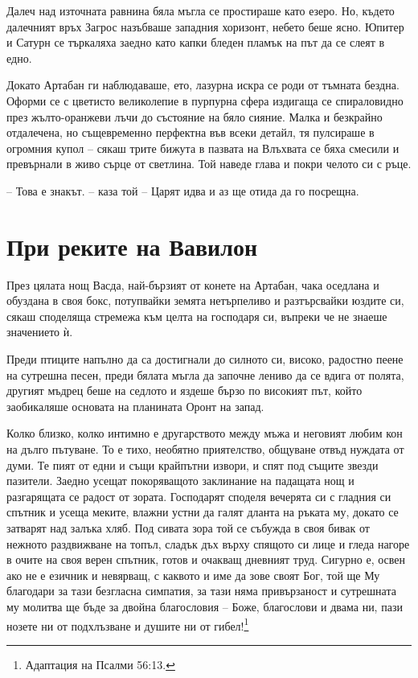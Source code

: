 Далеч над източната равнина бяла мъгла се простираше като езеро. Но, където
далечният връх Загрос назъбваше западния хоризонт, небето беше ясно. Юпитер и
Сатурн се търкаляха заедно като капки бледен пламък на път да се слеят в едно.

Докато Артабан ги наблюдаваше, ето, лазурна искра се роди от тъмната бездна.
Оформи се с цветисто великолепие в пурпурна сфера издигаща се спираловидно през
жълто-оранжеви лъчи до състояние на бяло сияние. Малка и безкрайно отдалечена,
но същевременно перфектна във всеки детайл, тя пулсираше в огромния купол --
сякаш трите бижута в пазвата на Влъхвата се бяха смесили и превърнали в живо
сърце от светлина. Той наведе глава и покри челото си с ръце.

-- Това е знакът. -- каза той -- Царят идва и аз ще отида да го посрещна.

\part{При реките на Вавилон}

През цялата нощ Васда, най-бързият от конете на Артабан, чака оседлана и
обуздана в своя бокс, потупвайки земята нетърпеливо и разтърсвайки юздите си,
сякаш споделяща стремежа към целта на господаря си, въпреки че не знаеше
значението ѝ.

Преди птиците напълно да са достигнали до силното си, високо, радостно пеене на
сутрешна песен, преди бялата мъгла да започне лениво да се вдига от полята,
другият мъдрец беше на седлото и яздеше бързо по високият път, който заобикаляше
основата на планината Оронт на запад.

Колко близко, колко интимно е другарството между мъжа и неговият любим кон на
дълго пътуване. То е тихо, необятно приятелство, общуване отвъд нуждата от думи.
Те пият от едни и същи крайпътни извори, и спят под същите звезди пазители.
Заедно усещат покоряващото заклинание на падащата нощ и разгарящата се радост от
зората. Господарят споделя вечерята си с гладния си спътник и усеща меките,
влажни устни да галят дланта на ръката му, докато се затварят над залъка хляб.
Под сивата зора той се събужда в своя бивак от нежното раздвижване на топъл,
сладък дъх върху спящото си лице и гледа нагоре в очите на своя верен спътник,
готов и очакващ дневният труд. Сигурно е, освен ако не е езичник и невярващ, с
каквото и име да зове своят Бог, той ще Му благодари за тази безгласна симпатия,
за тази няма привързаност и сутрешната му молитва ще бъде за двойна благословия
-- Боже, благослови и двама ни, пази нозете ни от подхлъзване и душите ни от
гибел!\footnote{Адаптация на Псалми 56:13.}

